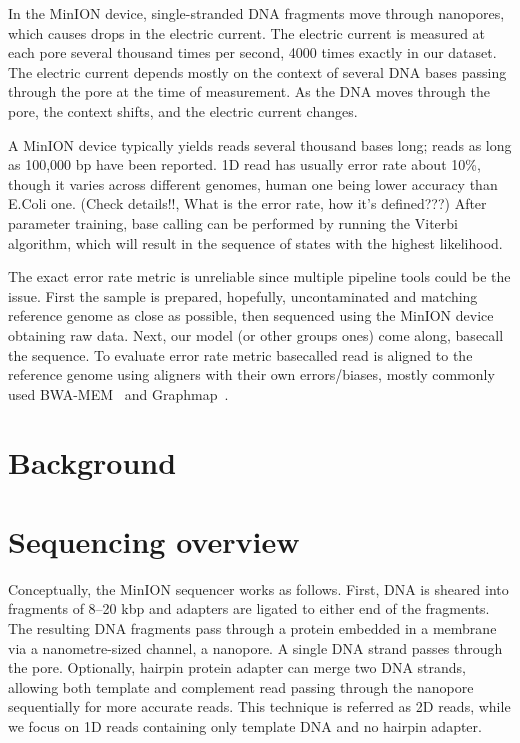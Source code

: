 \documentclass[runningheads,a4paper]{llncs}
\begin{document}
In the MinION device, single-stranded DNA fragments move through nanopores, which causes drops in the electric current. The electric current is measured at each pore several thousand times per second, 4000 times exactly in our dataset. The electric current depends mostly on the context of several DNA bases passing through the pore at the time of measurement. As the DNA moves through the pore, the context shifts, and the electric current changes.

A MinION device typically yields reads several thousand bases long; reads as long as 100,000 bp have been reported. 1D read has usually error rate about   10\%, though it varies across different genomes, human one being lower accuracy than E.Coli one. (Check details!!, What is the error rate, how it's defined???) After parameter training, base calling can be performed by running the Viterbi algorithm, which will result in the sequence of states with the highest likelihood.

The exact error rate metric is unreliable since multiple pipeline tools could be the issue. First the sample is prepared, hopefully, uncontaminated and matching reference genome as close as possible, then sequenced using the MinION device obtaining raw data. Next, our model (or other groups ones) come along, basecall the sequence. To evaluate error rate metric basecalled read is aligned to the reference genome using aligners with their own errors/biases, mostly commonly used BWA-MEM~\cite{li2013aligning} and Graphmap~\cite{sovic2016fast}.

\section{Background}

\section{Sequencing overview}
Conceptually, the MinION sequencer works as follows. First, DNA is sheared into fragments of 8–20 kbp and adapters are ligated to either end of the fragments. The resulting DNA fragments pass through a protein embedded in a membrane via a nanometre-sized channel, a nanopore. A single DNA strand passes through the pore. Optionally, hairpin protein adapter can merge two DNA strands, allowing both template and complement read passing through the nanopore sequentially for more accurate reads. This technique is referred as 2D reads, while we focus on 1D reads containing only template DNA and no hairpin adapter.
\end{document}
